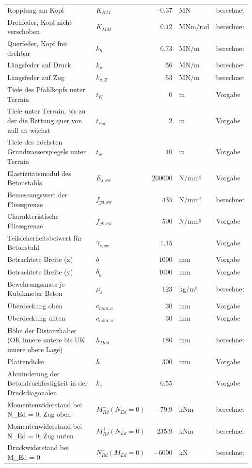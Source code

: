 \documentclass[11pt,a4paper]{article}
\begin{document}
\begin{xltabular}{\linewidth}{>{\raggedright\arraybackslash}Xlrll}
Kopplung am Kopf & $K_{HM}$ & $-0.37$ & MN & berechnet \\
Drehfeder, Kopf nicht verschoben & $K_{MM}$ & $0.12$ & MNm/rad & berechnet \\
Querfeder, Kopf frei drehbar & $k_h$ & $0.73$ & MN/m & berechnet \\
Längsfeder auf Druck & $k_v$ & $56$ & MN/m & berechnet \\
Längsfeder auf Zug & $k_{v,Z}$ & $53$ & MN/m & berechnet \\
Tiefe des Pfahlkopfs unter Terrain & $t_K$ & $0$ & m & Vorgabe \\
Tiefe unter Terrain, bis zu der die Bettung quer von null an wächst & $t_{red}$ & $2$ & m & Vorgabe \\
Tiefe des höchsten Grundwasserspiegels unter Terrain & $t_w$ & $10$ & m & Vorgabe \\
Elastizitätsmodul des Betonstahls & $E_{s,\text{sw}}$ & $200000$ & N/mm² & Vorgabe \\
Bemessungswert der Fliessgrenze & $f_{yd,\text{sw}}$ & $435$ & N/mm² & berechnet \\
Charakteristische Fliessgrenze & $f_{yk,\text{sw}}$ & $500$ & N/mm² & Vorgabe \\
Teilsicherheitsbeiwert für Betonstahl & $\gamma_{s,\text{sw}}$ & $1.15$ &  & Vorgabe \\
Betrachtete Breite (x) & $b$ & $1000$ & mm & Vorgabe \\
Betrachtete Breite (y) & $b_y$ & $1000$ & mm & Vorgabe \\
Bewehrungsmass je Kubikmeter Beton & $\mu_s$ & $123$ & kg/m³ & berechnet \\
Überdeckung oben & $c_{nom,o}$ & $30$ & mm & Vorgabe \\
Überdeckung unten & $c_{nom,u}$ & $30$ & mm & Vorgabe \\
Höhe der Distanzhalter (OK innere untere bis UK innere obere Lage) & $h_{Dist}$ & $186$ & mm & berechnet \\
Plattendicke & $h$ & $300$ & mm & Vorgabe \\
Abminderung der Betondruckfestigkeit in der Druckdiagonalen & $k_c$ & $0.55$ &  & Vorgabe \\
Momentenwiderstand bei N\_Ed = 0, Zug oben & $M_{Rd}^{-}(N_{Ed} = 0)$ & $-79.9$ & kNm & berechnet \\
Momentenwiderstand bei N\_Ed = 0, Zug unten & $M_{Rd}^{+}(N_{Ed} = 0)$ & $235.9$ & kNm & berechnet \\
Druckwiderstand bei M\_Ed = 0 & $N_{Rd}^{-}(M_{Ed} = 0)$ & $-6000$ & kN & berechnet \\

\end{xltabular}
\end{document}
